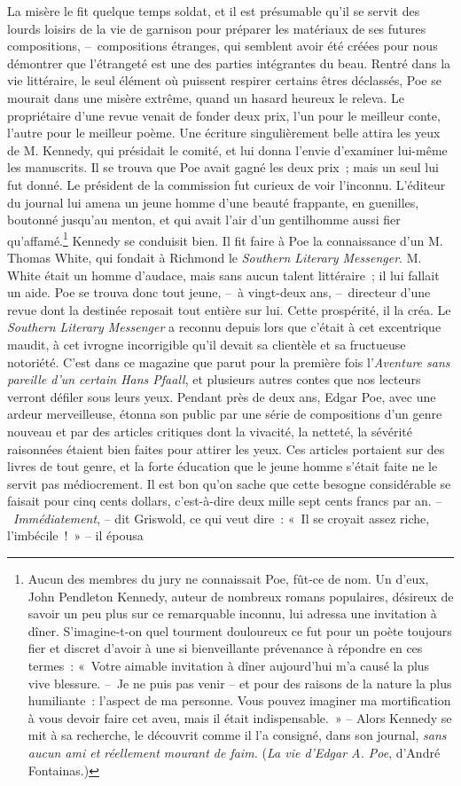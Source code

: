 \documentclass[french,twoside]{book} %
\begin{document}
La misère le fit quelque temps soldat, et il est présumable qu’il se servit des lourds loisirs de la vie de garnison pour préparer les matériaux de ses futures compositions, – compositions étranges, qui semblent avoir été créées pour nous démontrer que l’étrangeté est une des parties intégrantes du beau. Rentré dans la vie littéraire, le seul élément où puissent respirer certains êtres déclassés, Poe se mourait dans une misère extrême, quand un hasard heureux le releva. Le propriétaire d’une revue venait de fonder deux prix, l’un pour le meilleur conte, l’autre pour le meilleur poème. Une écriture singulièrement belle attira les yeux de M. Kennedy, qui présidait le comité, et lui donna l’envie d’examiner lui-même les manuscrits. Il se trouva que Poe avait gagné les deux prix ; mais un seul lui fut donné. Le président de la commission fut curieux de voir l’inconnu. L’éditeur du journal lui amena un jeune homme d’une beauté frappante, en guenilles, boutonné jusqu’au menton, et qui avait l’air d’un gentilhomme aussi fier qu’affamé.\footnote{Aucun des membres du jury ne connaissait Poe, fût-ce de nom. Un d’eux, John Pendleton Kennedy, auteur de nombreux romans populaires, désireux de savoir un peu plus sur ce remarquable inconnu, lui adressa une invitation à dîner. S’imagine-t-on quel tourment douloureux ce fut pour un poète toujours fier et discret d’avoir à une si bienveillante prévenance à répondre en ces termes : « Votre aimable invitation à dîner aujourd’hui m’a causé la plus vive blessure. – Je ne puis pas venir – et pour des raisons de la nature la plus humiliante : l’aspect de ma personne. Vous pouvez imaginer ma mortification à vous devoir faire cet aveu, mais il était indispensable. » – Alors Kennedy se mit à sa recherche, le découvrit comme il l’a consigné, dans son journal, \emph{sans aucun ami et réellement mourant de faim.} (\emph{La vie d’Edgar A. Poe}, d’André Fontainas.)} Kennedy se conduisit bien. Il fit faire à Poe la connaissance d’un M. Thomas White, qui fondait à Richmond le \emph{Southern Literary Messenger}. M. White était un homme d’audace, mais sans aucun talent littéraire ; il lui fallait un aide. Poe se trouva donc tout jeune, – à vingt-deux ans, – directeur d’une revue dont la destinée reposait tout entière sur lui. Cette prospérité, il la créa. Le \emph{Southern Literary Messenger} a reconnu depuis lors que c’était à cet excentrique maudit, à cet ivrogne incorrigible qu’il devait sa clientèle et sa fructueuse notoriété. C’est dans ce magazine que parut pour la première fois l’\emph{Aventure sans pareille d’un certain Hans Pfaall}, et plusieurs autres contes que nos lecteurs verront défiler sous leurs yeux. Pendant près de deux ans, Edgar Poe, avec une ardeur merveilleuse, étonna son public par une série de compositions d’un genre nouveau et par des articles critiques dont la vivacité, la netteté, la sévérité raisonnées étaient bien faites pour attirer les yeux. Ces articles portaient sur des livres de tout genre, et la forte éducation que le jeune homme s’était faite ne le servit pas médiocrement. Il est bon qu’on sache que cette besogne considérable se faisait pour cinq cents dollars, c’est-à-dire deux mille sept cents francs par an. – \emph{Immédiatement}, – dit Griswold, ce qui veut dire : « Il se croyait assez riche, l’imbécile ! » – il épousa 
\end{document}
